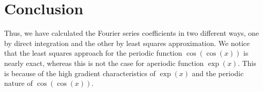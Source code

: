 \documentclass[11pt, a4paper]{article}
\begin{document}
\section{Conclusion}
Thus, we have calculated the Fourier series coefficients in two different ways, one by direct integration and the other by least squares approximation. We notice that the least squares approach for the periodic function $\cos(\cos(x))$ is nearly exact, whereas this is not the case for aperiodic function $\exp(x)$. This is because of the high gradient characteristics of $\exp(x)$ and the periodic nature of $\cos(\cos(x))$.
\end{document}

